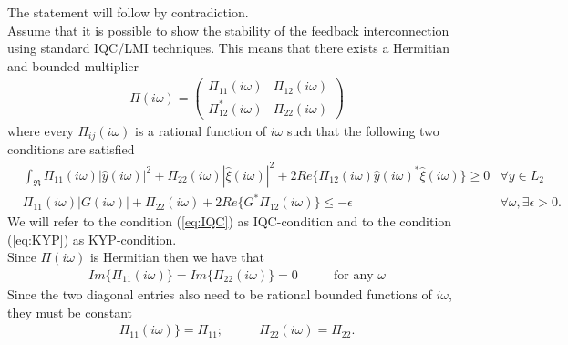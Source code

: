 \documentclass[a4paper,10pt]{article}
\newcommand{\w}{\omega}
\newcommand{\real}{Re}
\newcommand{\eps}{\epsilon}
\begin{document}
The statement will follow by contradiction.\\
Assume that it is possible to show the stability of the feedback interconnection using standard IQC/LMI techniques.
This means that there exists a Hermitian and bounded multiplier
\begin{align}
	\Pi(i\w)=
		\left(\begin{array}{cc}
			\Pi_{11}(i\w)	& \Pi_{12}(i\w)\\
			\Pi_{12}^*(i\w)	& \Pi_{22}(i\w)
		\end{array}\right)
\end{align}
where every $\Pi_{ij}(i\w)$ is a rational function of $i\w$ such that the following two conditions are satisfied
\begin{align}
	&\int_{\Re} \Pi_{11}(i\w) |\hat y(i\w)|^2+\Pi_{22}(i\w) |\hat \xi(i\w)|^2
		+ 2\real\{\Pi_{12}(i\w) \hat y(i\w)^*\hat \xi(i\w)  \}\geq 0
			& \forall y\in L_2 \label{eq:IQC} \\
	& \Pi_{11}(i\w) |G(i\w)|+\Pi_{22}(i\w) +2\real\{G^* \Pi_{12}(i\w)\}\leq -\eps
			& \forall \w, \exists \eps>0. \label{eq:KYP}
\end{align}
We will refer to the condition (\ref{eq:IQC}) as IQC-condition and to the condition (\ref{eq:KYP}) as KYP-condition.\\

Since $\Pi(i\w)$ is Hermitian  then we have that
\begin{align}
	Im\{\Pi_{11}(i\w)\}=Im\{\Pi_{22}(i\w)\}=0
		&\qquad \text{for any } \w
\end{align}
Since the two diagonal entries also need to be rational bounded functions of $i\w$, they must be constant
\begin{align}
	\Pi_{11}(i\w)\}=\Pi_{11}; &\qquad \Pi_{22}(i\w)=\Pi_{22}.
\end{align}
\end{document}
